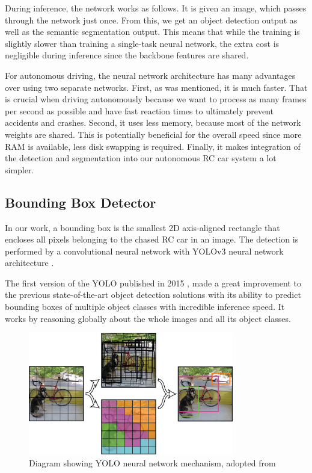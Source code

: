 During inference, the network works as follows. It is given an image, which passes through the network just once. From this, we get an object detection output as well as the semantic segmentation output. This means that while the training is slightly slower than training a single-task neural network, the extra cost is negligible during inference since the backbone features are shared. \par


For autonomous driving, the neural network architecture has many advantages over using two separate networks. First, as was mentioned, it is much faster. That is crucial when driving autonomously because we want to process as many frames per second as possible and have fast reaction times to ultimately prevent accidents and crashes. Second, it uses less memory, because most of the network weights are shared. This is potentially beneficial for the overall speed since more RAM is available, less disk swapping is required. Finally, it makes integration of the detection and segmentation into our autonomous RC car system a lot simpler.




\subsection{Bounding Box Detector}
In our work, a bounding box is the smallest 2D axis-aligned rectangle that encloses all pixels belonging to the chased RC car in an image. The detection is performed by a convolutional neural network \cite{CNN_Lecun} with YOLOv3 neural network architecture \cite{YOLOv3}. \par 
The first version of the YOLO published in 2015 \cite{YOLO}, made a great improvement to the previous state-of-the-art object detection solutions with its ability to predict bounding boxes of multiple object classes with incredible inference speed. It works by reasoning globally about the whole images and all its object classes. \par


\begin{figure}[h!]
    \centering
    \includegraphics[width=0.8\textwidth]{images/YOLO.png}
    
    \caption{Diagram showing YOLO neural network mechanism, adopted from \protect\cite{YOLO}}\label{f:YOLO}
\end{figure}


